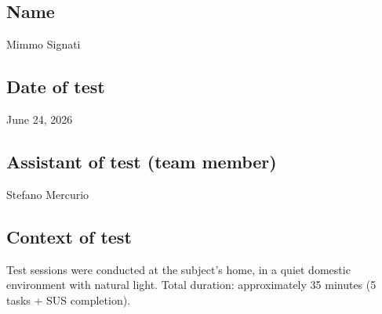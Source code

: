 ﻿\documentclass[11pt,a4paper]{article}
\begin{document}
\vspace{0.5cm}

\subsection*{Name}
\begin{tcolorbox}[base]
Mimmo Signati
\end{tcolorbox}

\subsection*{Date of test}
\begin{tcolorbox}[base]
June 24, 2026
\end{tcolorbox}

\subsection*{Assistant of test (team member)}
\begin{tcolorbox}[base]
Stefano Mercurio
\end{tcolorbox}

\subsection*{Context of test}
\begin{tcolorbox}[base]
Test sessions were conducted at the subject's home, in a
quiet domestic environment with natural light. Total
duration: approximately 35 minutes (5 tasks + SUS completion).
\end{tcolorbox}
\end{document}
